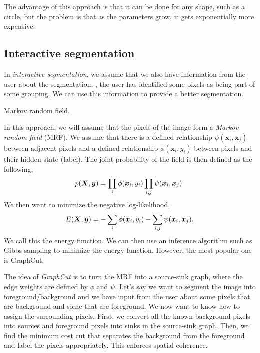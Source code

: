 The advantage of this approach is that it can be done for any shape, such as
a circle, but the problem is that as the parameters grow, it gets
exponentially more expensive.

\subsection{Interactive segmentation}

In \textit{interactive segmentation}, we assume that we also have information
from the user about the segmentation. \Ie, the user has identified some pixels
as being part of some grouping. We can use this information to provide a better
segmentation.

\begin{marginfigure}
    \centering
    \caption{Markov random field.}
    \label{fig:mrf}
\end{marginfigure}

In this approach, we will assume that the pixels of the image form a
\textit{Markov random field} (MRF). We assume that there is a defined
relationship $\psi(\bm{x}_i,\bm{x}_j)$ between adjacent pixels and a defined
relationship $\phi(\bm{x}_i,y_i)$ between pixels and their hidden state
(label). The joint probability of the field is then defined as the following,
\[
  p(\bm{X},\bm{y}) = \prod_i \phi(\bm{x}_i,y_i) \prod_{i,j} \psi(\bm{x}_i,\bm{x}_j)
.\]
We then want to minimize the negative log-likelihood, \[
  E(\bm{X},\bm{y}) = -\sum_i \phi(\bm{x}_i,y_i) -\sum_{i,j} \psi(\bm{x}_i,\bm{x}_j)
.\]
We call this the energy function. We can then use an inference algorithm such
as Gibbs sampling to minimize the energy function. However, the most popular
one is GraphCut.

The idea of \textit{GraphCut} is to turn the MRF into a source-sink graph,
where the edge weights are defined by $\phi$ and $\psi$. Let's say we want to
segment the image into foreground/background and we have input
from the user about some pixels that are background and some that are
foreground. We now want to know how to assign the surrounding pixels. First, we
convert all the known background pixels into sources and foreground pixels into
sinks in the source-sink graph. Then, we find the minimum cost cut that
separates the background from the foreground and label the pixels
appropriately. This enforces spatial coherence.


